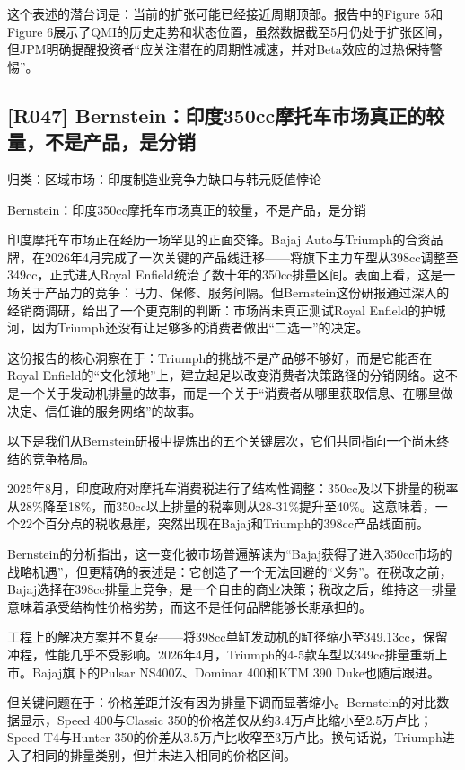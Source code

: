 \documentclass[11pt]{ctexart}
\begin{document}
这个表述的潜台词是：当前的扩张可能已经接近周期顶部。报告中的Figure 5和Figure 6展示了QMI的历史走势和状态位置，虽然数据截至5月仍处于扩张区间，但JPM明确提醒投资者“应关注潜在的周期性减速，并对Beta效应的过热保持警惕”。

\subsection{[R047] Bernstein：印度350cc摩托车市场真正的较量，不是产品，是分销}
{\small\color{refgray}归类：区域市场：印度制造业竞争力缺口与韩元贬值悖论}

Bernstein：印度350cc摩托车市场真正的较量，不是产品，是分销

印度摩托车市场正在经历一场罕见的正面交锋。Bajaj Auto与Triumph的合资品牌，在2026年4月完成了一次关键的产品线迁移——将旗下主力车型从398cc调整至349cc，正式进入Royal Enfield统治了数十年的350cc排量区间。表面上看，这是一场关于产品力的竞争：马力、保修、服务间隔。但Bernstein这份研报通过深入的经销商调研，给出了一个更克制的判断：市场尚未真正测试Royal Enfield的护城河，因为Triumph还没有让足够多的消费者做出“二选一”的决定。

这份报告的核心洞察在于：Triumph的挑战不是产品够不够好，而是它能否在Royal Enfield的“文化领地”上，建立起足以改变消费者决策路径的分销网络。这不是一个关于发动机排量的故事，而是一个关于“消费者从哪里获取信息、在哪里做决定、信任谁的服务网络”的故事。

以下是我们从Bernstein研报中提炼出的五个关键层次，它们共同指向一个尚未终结的竞争格局。

2025年8月，印度政府对摩托车消费税进行了结构性调整：350cc及以下排量的税率从28\%降至18\%，而350cc以上排量的税率则从28-31\%提升至40\%。这意味着，一个22个百分点的税收悬崖，突然出现在Bajaj和Triumph的398cc产品线面前。

Bernstein的分析指出，这一变化被市场普遍解读为“Bajaj获得了进入350cc市场的战略机遇”，但更精确的表述是：它创造了一个无法回避的“义务”。在税改之前，Bajaj选择在398cc排量上竞争，是一个自由的商业决策；税改之后，维持这一排量意味着承受结构性价格劣势，而这不是任何品牌能够长期承担的。

工程上的解决方案并不复杂——将398cc单缸发动机的缸径缩小至349.13cc，保留冲程，性能几乎不受影响。2026年4月，Triumph的4-5款车型以349cc排量重新上市。Bajaj旗下的Pulsar NS400Z、Dominar 400和KTM 390 Duke也随后跟进。

但关键问题在于：价格差距并没有因为排量下调而显著缩小。Bernstein的对比数据显示，Speed 400与Classic 350的价格差仅从约3.4万卢比缩小至2.5万卢比；Speed T4与Hunter 350的价差从3.5万卢比收窄至3万卢比。换句话说，Triumph进入了相同的排量类别，但并未进入相同的价格区间。
\end{document}
